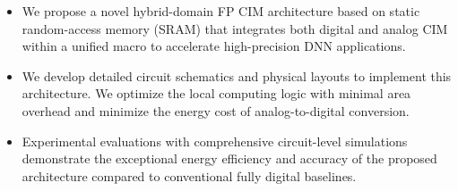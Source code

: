 \begin{itemize}

\item We propose a novel hybrid-domain FP CIM architecture based on static random-access memory (SRAM) that integrates both digital and analog CIM within a unified macro to accelerate high-precision DNN applications. 
 
\item We develop detailed circuit schematics and physical layouts to implement this architecture. 
We optimize the local computing logic with minimal area overhead and minimize the energy cost of analog-to-digital conversion.


\item Experimental evaluations with comprehensive circuit-level simulations demonstrate the exceptional energy efficiency and accuracy of the proposed architecture compared to conventional fully digital baselines.
\end{itemize}  



